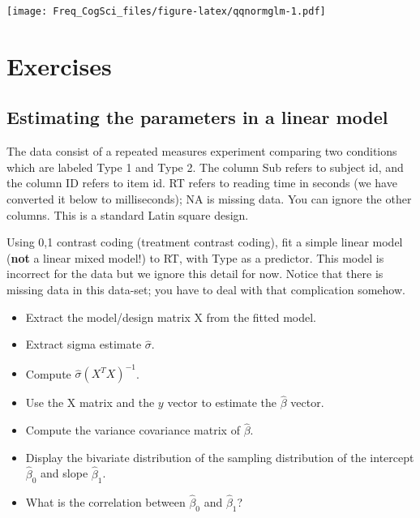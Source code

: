 \documentclass[12pt,]{krantz}
\newenvironment{Shaded}{\begin{snugshade}}{\end{snugshade}}
\newcommand{\CommentTok}[1]{\textcolor[rgb]{0.56,0.35,0.01}{\textit{#1}}}
\newcommand{\DataTypeTok}[1]{\textcolor[rgb]{0.13,0.29,0.53}{#1}}
\newcommand{\DecValTok}[1]{\textcolor[rgb]{0.00,0.00,0.81}{#1}}
\newcommand{\KeywordTok}[1]{\textcolor[rgb]{0.13,0.29,0.53}{\textbf{#1}}}
\newcommand{\NormalTok}[1]{#1}
\newcommand{\OperatorTok}[1]{\textcolor[rgb]{0.81,0.36,0.00}{\textbf{#1}}}
\newcommand{\OtherTok}[1]{\textcolor[rgb]{0.56,0.35,0.01}{#1}}
\newcommand{\StringTok}[1]{\textcolor[rgb]{0.31,0.60,0.02}{#1}}
\providecommand{\tightlist}{%
  \setlength{\itemsep}{0pt}\setlength{\parskip}{0pt}}
\begin{document}
\texttt{[image: Freq\_CogSci\_files/figure-latex/qqnormglm-1.pdf]}

\hypertarget{sec:LMExercises2}{%
\section{Exercises}\label{sec:LMExercises2}}

\hypertarget{sec:LMparamest}{%
\subsection{Estimating the parameters in a linear model}\label{sec:LMparamest}}

The data consist of a repeated measures experiment comparing two conditions which are labeled Type 1 and Type 2. The column Sub refers to subject id, and the column ID refers to item id. RT refers to reading time in seconds (we have converted it below to milliseconds); NA is missing data. You can ignore the other columns. This is a standard Latin square design.

\begin{Shaded}
\end{Shaded}

Using 0,1 contrast coding (treatment contrast coding), fit a simple linear model (\textbf{not} a linear mixed model!) to RT, with Type as a predictor. This model is incorrect for the data but we ignore this detail for now. Notice that there is missing data in this data-set; you have to deal with that complication somehow.

\begin{itemize}
\tightlist
\item
  Extract the model/design matrix X from the fitted model.
\item
  Extract sigma estimate \(\hat\sigma\).
\item
  Compute \(\hat\sigma (X^TX)^{-1}\).
\item
  Use the X matrix and the \(y\) vector to estimate the \(\hat\beta\) vector.
\item
  Compute the variance covariance matrix of \(\hat\beta\).
\item
  Display the bivariate distribution of the sampling distribution of the intercept \(\hat \beta_0\) and slope \(\hat\beta_1\).
\item
  What is the correlation between \(\hat \beta_0\) and \(\hat\beta_1\)?
\end{itemize}
\end{document}
